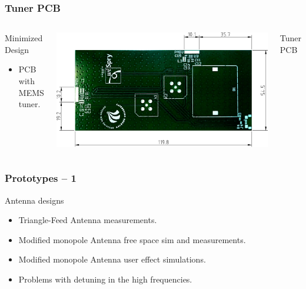\begin{frame}[fragile]
    \frametitle{Tuner PCB}
    \begin{columns}[onlytextwidth,t]
        \begin{block}{Minimized Design}
          \begin{itemize}
          \item PCB with MEMS tuner.
          \end{itemize}
        \end{block}
        \begin{center}
            \includegraphics[scale=0.33]{img/Lasse/samanthas_board.pdf}
        \end{center}
        Tuner PCB
    \end{columns}
\end{frame}

\begin{frame}
  \frametitle{Prototypes -- 1}
  \begin{block}{Antenna designs}
      \begin{itemize}
      \item Triangle-Feed Antenna measurements.
      \item Modified monopole Antenna free space sim and measurements.
      \item Modified monopole Antenna user effect simulations.
      \item Problems with detuning in the high frequencies.
      \end{itemize}
  \end{block}
\end{frame}

